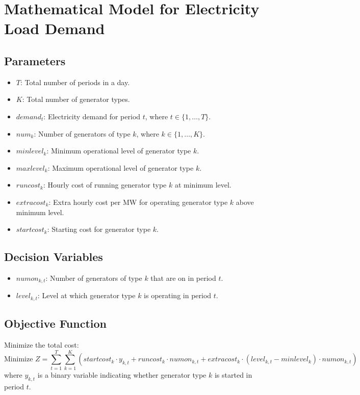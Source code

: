 \documentclass{article}
\begin{document}
\section*{Mathematical Model for Electricity Load Demand}

\subsection*{Parameters}
\begin{itemize}
    \item $T$: Total number of periods in a day.
    \item $K$: Total number of generator types.
    \item $demand_t$: Electricity demand for period $t$, where $t \in \{1, \ldots, T\}$.
    \item $num_k$: Number of generators of type $k$, where $k \in \{1, \ldots, K\}$.
    \item $minlevel_k$: Minimum operational level of generator type $k$.
    \item $maxlevel_k$: Maximum operational level of generator type $k$.
    \item $runcost_k$: Hourly cost of running generator type $k$ at minimum level.
    \item $extracost_k$: Extra hourly cost per MW for operating generator type $k$ above minimum level.
    \item $startcost_k$: Starting cost for generator type $k$.
\end{itemize}

\subsection*{Decision Variables}
\begin{itemize}
    \item $numon_{k,t}$: Number of generators of type $k$ that are on in period $t$.
    \item $level_{k,t}$: Level at which generator type $k$ is operating in period $t$.
\end{itemize}

\subsection*{Objective Function}
Minimize the total cost:
\[
\text{Minimize } Z = \sum_{t=1}^{T} \sum_{k=1}^{K} \left( startcost_k \cdot y_{k,t} + runcost_k \cdot numon_{k,t} + extracost_k \cdot (level_{k,t} - minlevel_k) \cdot numon_{k,t} \right)
\]
where \(y_{k,t}\) is a binary variable indicating whether generator type \(k\) is started in period \(t\).
\end{document}
